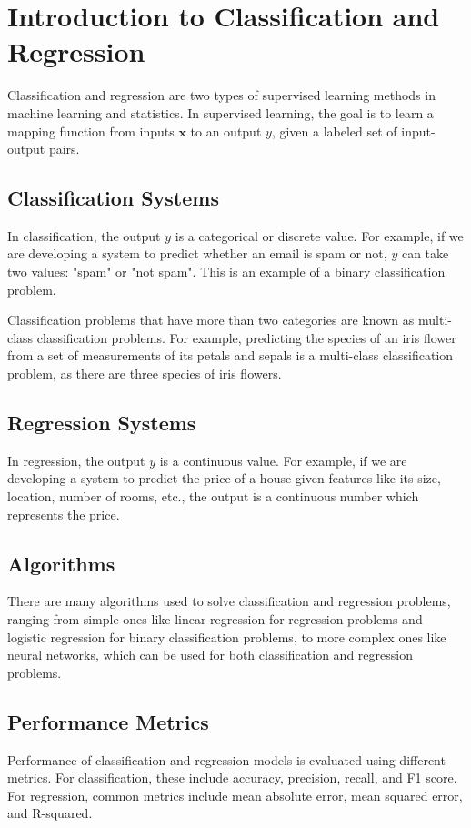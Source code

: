 \chapter{Introduction to Classification and Regression}


Classification and regression are two types of supervised learning methods in machine learning and statistics. In supervised learning, the goal is to learn a mapping function from inputs $\mathbf{x}$ to an output $y$, given a labeled set of input-output pairs.

\section{Classification Systems}

In classification, the output $y$ is a categorical or discrete value. For example, if we are developing a system to predict whether an email is spam or not, $y$ can take two values: "spam" or "not spam". This is an example of a binary classification problem.

Classification problems that have more than two categories are known as multi-class classification problems. For example, predicting the species of an iris flower from a set of measurements of its petals and sepals is a multi-class classification problem, as there are three species of iris flowers.

\section{Regression Systems}

In regression, the output $y$ is a continuous value. For example, if we are developing a system to predict the price of a house given features like its size, location, number of rooms, etc., the output is a continuous number which represents the price.

\section{Algorithms}

There are many algorithms used to solve classification and regression problems, ranging from simple ones like linear regression for regression problems and logistic regression for binary classification problems, to more complex ones like neural networks, which can be used for both classification and regression problems.

\section{Performance Metrics}

Performance of classification and regression models is evaluated using different metrics. For classification, these include accuracy, precision, recall, and F1 score. For regression, common metrics include mean absolute error, mean squared error, and R-squared.

\
